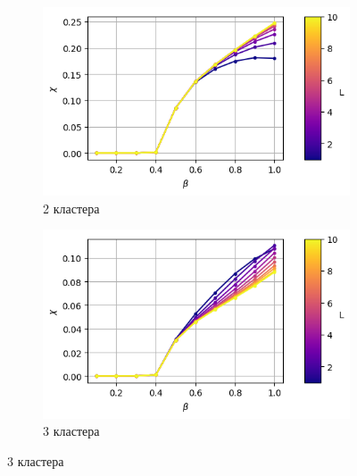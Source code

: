 \begin{figure}[ht]
	\centering
    \begin{subfigure}[t]{0.4\textwidth}
        \includegraphics*[width=\textwidth]{../images/magnetic_susceptibility/clusterized_W20_H50_N2.png}
        \caption*{2 кластера}
    \end{subfigure}
    \begin{subfigure}[t]{0.4\textwidth}
        \includegraphics*[width=\textwidth]{../images/magnetic_susceptibility/clusterized_W20_H50_N3.png}
        \caption*{3 кластера}


\end{subfigure}
\end{figure}

